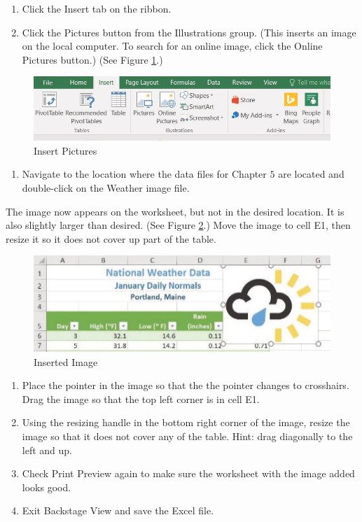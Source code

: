 \begin{enumerate}
	\item Click the Insert tab on the ribbon.
	\item Click the Pictures button from the Illustrations group. (This inserts an image on the local computer. To search for an online image, click the Online Pictures button.) (See Figure \ref{05:fig28}.)
\end{enumerate}

\begin{figure}[H]
	\centering
	\includegraphics[width=\maxwidth{.95\linewidth}]{gfx/ch05_fig28}
	\caption{Insert Pictures}
	\label{05:fig28}
\end{figure}

\begin{enumerate}[resume]
	\item Navigate to the location where the data files for Chapter $ 5 $ are located and double-click on the Weather image file.
\end{enumerate}

The image now appears on the worksheet, but not in the desired location. It is also slightly larger than desired. (See Figure \ref{05:fig29}.) Move the image to cell E1, then resize it so it does not cover up part of the table.

\begin{figure}[H]
	\centering
	\includegraphics[width=\maxwidth{.95\linewidth}]{gfx/ch05_fig29}
	\caption{Inserted Image}
	\label{05:fig29}
\end{figure}

\begin{enumerate}
	\item Place the pointer in the image so that the the pointer changes to crosshairs. Drag the image so that the top left corner is in cell E1.
	\item Using the resizing handle in the bottom right corner of the image, resize the image so that it does not cover any of the table. Hint: drag diagonally to the left and up.
	\item Check Print Preview again to make sure the worksheet with the image added looks good.
\item Exit Backstage View and save the Excel file.
\end{enumerate}

